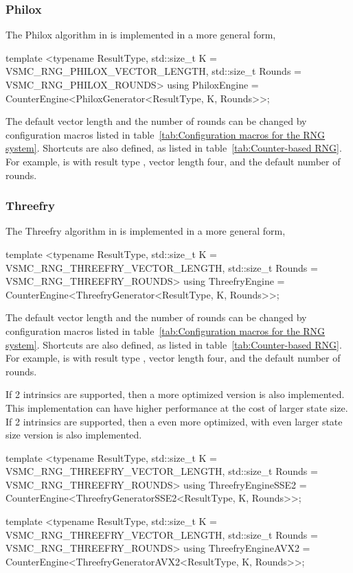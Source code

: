 \subsubsection{Philox}
\label{ssub:Philox}

The Philox algorithm in \textcite{Salmon:2011um} is implemented in a more
general form,
\begin{cppcode}
  template <typename ResultType, std::size_t K = VSMC_RNG_PHILOX_VECTOR_LENGTH,
  std::size_t Rounds = VSMC_RNG_PHILOX_ROUNDS>
  using PhiloxEngine = CounterEngine<PhiloxGenerator<ResultType, K, Rounds>>;
\end{cppcode}
The default vector length and the number of rounds can be changed by
configuration macros listed in table~\ref{tab:Configuration macros for the RNG
  system}. Shortcuts are also defined, as listed in
table~\ref{tab:Counter-based RNG}. For example,  is
 with result type , vector
length four, and the default number of rounds.

\subsubsection{Threefry}
\label{ssub:Threefry}

The Threefry algorithm in \textcite{Salmon:2011um} is implemented in a more
general form,
\begin{cppcode}
  template <typename ResultType, std::size_t K = VSMC_RNG_THREEFRY_VECTOR_LENGTH,
  std::size_t Rounds = VSMC_RNG_THREEFRY_ROUNDS>
  using ThreefryEngine = CounterEngine<ThreefryGenerator<ResultType, K, Rounds>>;
\end{cppcode}
The default vector length and the number of rounds can be changed by
configuration macros listed in table~\ref{tab:Configuration macros for the RNG
  system}. Shortcuts are also defined, as listed in
table~\ref{tab:Counter-based RNG}. For example,  is
 with result type , vector
length four, and the default number of rounds.

If \sse{}2 intrinsics are supported, then a more optimized version is also
implemented. This implementation can have higher performance at the cost of
larger state size. If \avx{}2 intrinsics are supported, then a even more
optimized, with even larger state size version is also implemented.
\begin{cppcode}
  template <typename ResultType, std::size_t K = VSMC_RNG_THREEFRY_VECTOR_LENGTH,
  std::size_t Rounds = VSMC_RNG_THREEFRY_ROUNDS>
  using ThreefryEngineSSE2 =
  CounterEngine<ThreefryGeneratorSSE2<ResultType, K, Rounds>>;

  template <typename ResultType, std::size_t K = VSMC_RNG_THREEFRY_VECTOR_LENGTH,
  std::size_t Rounds = VSMC_RNG_THREEFRY_ROUNDS>
  using ThreefryEngineAVX2 =
  CounterEngine<ThreefryGeneratorAVX2<ResultType, K, Rounds>>;
\end{cppcode}

